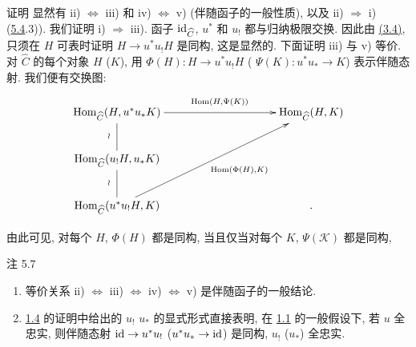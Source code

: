 \begin{enonce*}[remark]{证明}
显然有 ii) $\Leftrightarrow$ iii) 和 iv) $\Leftrightarrow$
v) (伴随函子的一般性质), 以及 ii)
$\Rightarrow$ i) (\hyperref[I.prop5.4]{5.4}.3)). 我们证明 i) $\Rightarrow$
iii). 函子 $\operatorname{id}_{\widehat{C}}$, $u^\ast$ 和
$u_{!}$ 都与归纳极限交换. 因此由 \hyperref[I.prop3.4]{(3.4)},
只须在 $H$ 可表时证明 $H\rightarrow u^\ast u_{!} H$ 是同构, 这是显然的.
下面证明 iii) 与 v) 等价.
对 $\widehat{C}$ 的每个对象 $H$ (\resp $K$), 用
$\Phi(H):H\rightarrow u^\ast u_{!} H$ (\resp
$\Psi(K):u^\ast u_\ast\rightarrow K$) 表示伴随态射. 我们便有交换图:
\[
\xymatrix@C=3.5cm@L=6pt{
\Hom_{\widehat{C}}(H,u^{\ast}u_{\ast}
K)\ar@{-}[d]_{\wr}\ar[r]^{\quad \Hom(H,\Psi(K))}   & \Hom_{\widehat{C}}(H,K)\\
\Hom_{\widehat{C}}(u_{!}H,u_{\ast}K)\ar@{-}[d]_{\wr} &  \\
\Hom_{\widehat{C}}(u^{\ast}u_{!}H,K)\ar[uru]_{\quad
   \Hom(\Phi(H),K)} & .
}
\]

由此\pageoriginale 可见, 对每个 $H$, $\Phi(H)$ 都是同构,
当且仅当对每个 $K$, $\Psi(𝒦)$ 都是同构, \cqfd
\end{enonce*}

\begin{enonce*}[remark]{注 5.7}
\begin{enumerate}
\renewcommand{\theenumi}{\alph{enumi}}
\renewcommand{\labelenumi}{\theenumi)}
\item 等价关系 ii) $\Leftrightarrow$ iii)
  $\Leftrightarrow$ iv) $\Leftrightarrow$ v) 是伴随函子的一般结论.

\item \hyperref[I.prop1.4]{1.4} 的证明中给出的 $u_{!}$ \resp $u_\ast$
的显式形式直接表明, 在 \hyperref[I.def1.1]{1.1} 的一般假设下,
若 $u$ 全忠实, 则伴随态射 $\operatorname{id}\rightarrow u^\ast u_{!}$
(\resp $u^\ast u_\ast\rightarrow \operatorname{id}$) 是同构,
\ie $u_{!}$ (\resp $u_\ast$) 全忠实.
\end{enumerate}
\end{enonce*}

\setcounter{subsection}{8} \setcounter{subsubsection}{-1}



